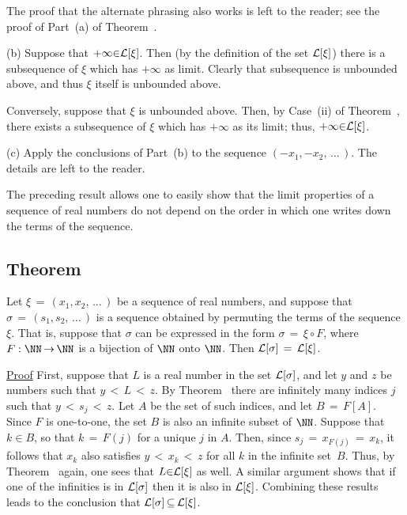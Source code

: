         The proof that the alternate phrasing also works is left to the reader;
    see the proof of Part~(a) of Theorem~.

\V

         (b) Suppose that $+{\infty}{\in}{\cal L}[{\xi}]$.
 Then (by the definition of  the set ${\cal L}[{\xi}]$) there is a subsequence of ${\xi}$ which has $+{\infty}$ as limit.
    Clearly that subsequence is unbounded above, and thus ${\xi}$ itself is unbounded above.

        Conversely, suppose that ${\xi}$ is unbounded above.
    Then, by Case~(ii) of Theorem~, there exists a subsequence of ${\xi}$ which has $+{\infty}$ as its limit; thus, $+{\infty}{\in}{\cal L}[{\xi}]$.

\V

        (c) Apply the conclusions of Part~(b) to the sequence $(-x_{1},-x_{2},\,{\ldots}\,)$.
    The details are left to the reader.

\V
\V

        The preceding result allows one to easily show that the limit properties of a sequence of real numbers do not depend on the order in which one writes down the terms of the sequence.

\V
\V

            \subsection{\small{\bf Theorem}}
            \label{ThmC50.110}

        Let ${\xi} \,=\, (x_{1},x_{2},\,{\ldots}\,)$ be a sequence of real numbers, and suppose that ${\sigma} \,=\, (s_{1},s_{2},\,{\ldots}\,)$ is a sequence obtained by permuting the terms of the sequence ${\xi}$.
    That is, suppose that ${\sigma}$ can be expressed in the form ${\sigma} \,=\, {\xi}{\circ}F$, where $F:{\NN} \,{\rightarrow}\, {\NN}$ is a bijection of ${\NN}$ onto ${\NN}$.
    Then ${\cal L}[{\sigma}] \,=\, {\cal L}[{\xi}]$.

\V

        \underline{Proof} First, suppose that $L$ is a real number in the set ${\cal L}[{\sigma}]$,
    and let $y$ and $z$ be numbers such that $y\,<\,L\,<\,z$. By Theorem~ there are infinitely many indices $j$ such that $y\,<\,s_{j}\,<\,z$.
    Let $A$ be the set of such indices, and let $B \,=\, F[A]$. Since $F$ is one-to-one, the set $B$ is also an infinite subset of ${\NN}$.
    Suppose that $k{\in}B$, so that $k \,=\, F(j)$ for a unique $j$ in $A$.
    Then, since $s_{j} \,=\, x_{F(j)} \,=\, x_{k}$, it follows that $x_{k}$ also satisfies $y\,<\,x_{k}\,<\,z$ for all $k$ in the infinite set~$B$.
    Thus, by Theorem~ again, one sees that $L{\in}{\cal L}[{\xi}]$ as well.
    A similar argument shows that if one of the infinities is in ${\cal L}[{\sigma}]$ then it is also in ${\cal L}[{\xi}]$.
    Combining these results leads to the conclusion that ${\cal L}[{\sigma}] \,{\subseteq}\, {\cal L}[{\xi}]$.

